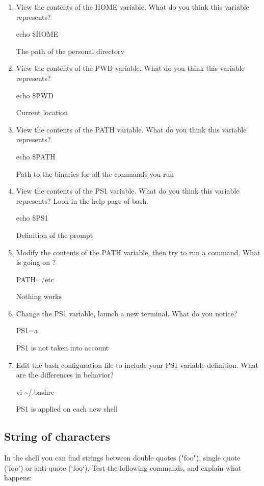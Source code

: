 \documentclass[11pt]{article}
\begin{document}
\begin{enumerate}
	\item View the contents of the HOME variable. What do you think this variable represents?
	\begin{solution}
		echo \$HOME
		
		The path of the personal directory
	\end{solution}
	\item View the contents of the PWD variable. What do you think this variable represents?
	\begin{solution}
		echo \$PWD
		
		Current location
	\end{solution}
	\item View the contents of the PATH variable. What do you think this variable represents?
	\begin{solution}
		echo \$PATH
		
		Path to the binaries for all the commands you run
	\end{solution}
	\item View the contents of the PS1 variable. What do you think this variable represents? Look in the help page of bash.
	\begin{solution}
		echo \$PS1
		
		Definition of the prompt
	\end{solution}
	\item Modify the contents of the PATH variable, then try to run a command. What is going on ?
	\begin{solution}
		PATH=/etc
		
		Nothing works
	\end{solution}
	\item Change the PS1 variable, launch a new terminal. What do you notice?
	\begin{solution}
		PS1=a
		
		PS1 is not taken into account
	\end{solution}
	\item Edit the bash configuration file to include your PS1 variable definition. What are the differences in behavior?
	\begin{solution}
		vi \textasciitilde{}/.bashrc
		
		PS1 is applied on each new shell
	\end{solution}
\end{enumerate}

\subsection{String of characters}
In the shell you can find strings between double quotes ("foo"), single quote ('foo') or anti-quote (`foo`). Test the following commands, and explain what happens:
\end{document}
